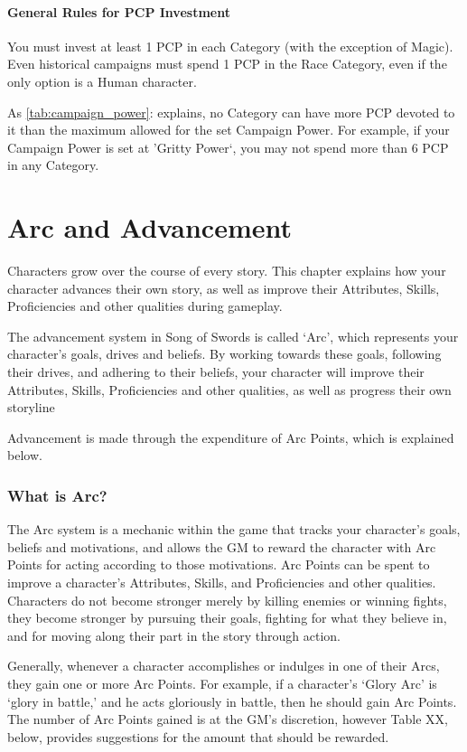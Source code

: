 \documentclass[oneside,11pt,english]{book}
\begin{document}
\subsubsection{General Rules for PCP Investment}
You must invest at least 1 PCP in each Category (with the exception of Magic). Even historical 
campaigns must spend 1 PCP in the Race Category, even if the only option is a Human character. 

 
As \autoref{tab:campaign_power}:  explains, no Category can have more PCP devoted to it than the maximum allowed for the 
set Campaign Power. For example, if your Campaign Power is set at 'Gritty Power`, you may not spend 
more than 6 PCP in any Category. 
\chapter{Arc and Advancement}\label{ch:arc}
\startcontents[chapters]
\clearpage
Characters grow over the course of every story. This chapter explains how your character advances their 
own story, as well as improve their Attributes, Skills, Proficiencies and other qualities during gameplay. 

The advancement system in Song of Swords is called ‘Arc’, which represents your character’s goals, 
drives and beliefs. By working towards these goals, following their drives, and adhering to their beliefs, 
your character will improve their Attributes, Skills, Proficiencies and other qualities, as well as progress 
their own storyline 

 
Advancement is made through the expenditure of Arc Points, which is explained below. 

 
\subsection*{What is Arc?}
The Arc system is a mechanic within the game that tracks your character’s goals, beliefs and motivations, 
and allows the GM to reward the character with Arc Points for acting according to those motivations. Arc 
Points can be spent to improve a character’s Attributes, Skills, and Proficiencies and other qualities. 
Characters do not become stronger merely by killing enemies or winning fights, they become stronger by 
pursuing their goals, fighting for what they believe in, and for moving along their part in the story through 
action. 

 
Generally, whenever a character accomplishes or indulges in one of their Arcs, they gain one or more Arc 
Points. For example, if a character’s ‘Glory Arc’ is ‘glory in battle,’ and he acts gloriously in battle, then 
he should gain Arc Points. The number of Arc Points gained is at the GM’s discretion, however Table 
XX, below, provides suggestions for the amount that should be rewarded. 
\end{document}
